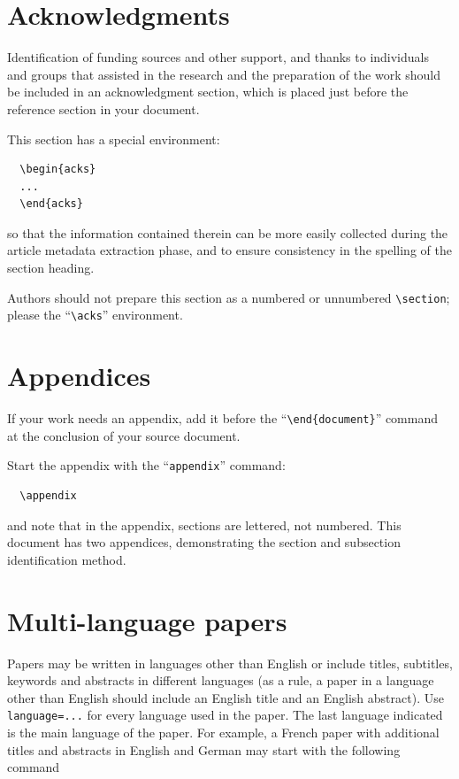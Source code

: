 \documentclass[
  letterpaper,
  DIV=11,
  numbers=noendperiod]{scrartcl}
\begin{document}
\hypertarget{acknowledgments}{%
\section{Acknowledgments}\label{acknowledgments}}

Identification of funding sources and other support, and thanks to
individuals and groups that assisted in the research and the preparation
of the work should be included in an acknowledgment section, which is
placed just before the reference section in your document.

This section has a special environment:

\begin{verbatim}
  \begin{acks}
  ...
  \end{acks}
\end{verbatim}

so that the information contained therein can be more easily collected
during the article metadata extraction phase, and to ensure consistency
in the spelling of the section heading.

Authors should not prepare this section as a numbered or unnumbered
\texttt{\textbackslash{}section}; please the
``\texttt{\textbackslash{}acks}'' environment.

\hypertarget{appendices}{%
\section{Appendices}\label{appendices}}

If your work needs an appendix, add it before the
``\texttt{\textbackslash{}end\{document\}}'' command at the conclusion
of your source document.

Start the appendix with the ``\texttt{appendix}'' command:

\begin{verbatim}
  \appendix
\end{verbatim}

and note that in the appendix, sections are lettered, not numbered. This
document has two appendices, demonstrating the section and subsection
identification method.

\hypertarget{multi-language-papers}{%
\section{Multi-language papers}\label{multi-language-papers}}

Papers may be written in languages other than English or include titles,
subtitles, keywords and abstracts in different languages (as a rule, a
paper in a language other than English should include an English title
and an English abstract). Use \texttt{language=...} for every language
used in the paper. The last language indicated is the main language of
the paper. For example, a French paper with additional titles and
abstracts in English and German may start with the following command
\end{document}
